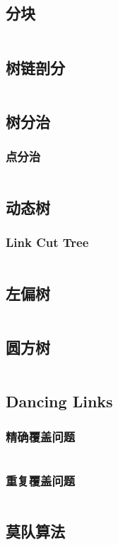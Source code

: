 \documentclass[a4paper,12pt]{article}
\begin{document}
\subsection{分块}
\inputminted[breaklines, linenos]{c++}{ds/decompose.cc}
\subsection{树链剖分}
\inputminted[breaklines, linenos]{c++}{ds/hld.cc}
\subsection{树分治}
\subsubsection{点分治}
\inputminted[breaklines, linenos]{c++}{ds/tree_divide.cc}
\subsection{动态树}
\subsubsection{Link Cut Tree}
\inputminted[breaklines, linenos]{c++}{ds/lct.cc}
\subsection{左偏树}
\inputminted[breaklines, linenos]{c++}{ds/leftist.cc}
\subsection{圆方树}
\inputminted[breaklines, linenos]{c++}{ds/cactus.cc}
\subsection{Dancing Links}
\subsubsection{精确覆盖问题}
\inputminted[breaklines, linenos]{c++}{ds/exact_cover.cc}
\subsubsection{重复覆盖问题}
\inputminted[breaklines, linenos]{c++}{ds/multi_cover.cc}
\subsection{莫队算法}
\end{document}
